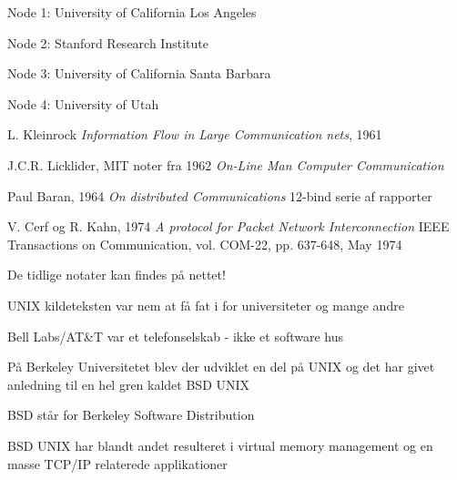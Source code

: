\documentclass[Screen16to9,17pt]{foils}
\begin{document}

\begin{list2}
\item Node 1: University of California Los Angeles
\item Node 2: Stanford Research Institute
\item Node 3: University of California Santa Barbara
\item Node 4: University of Utah
\end{list2}


\begin{list1}
\item L. Kleinrock \emph{Information Flow in Large Communication nets}, 1961
\item J.C.R. Licklider, MIT noter fra 1962 \emph{On-Line Man Computer
  Communication}
\item Paul Baran, 1964 \emph{On distributed Communications}
12-bind serie af rapporter\\
\item V. Cerf og R. Kahn, 1974
\emph{A protocol for Packet Network Interconnection}
IEEE Transactions on Communication, vol. COM-22, pp. 637-648, May 1974
\item De tidlige notater kan findes på nettet!
\end{list1}



\begin{list1}
  \item UNIX kildeteksten var nem at få fat i for universiteter og
  mange andre
\item Bell Labs/AT\&T var et telefonselskab - ikke et software hus
\item På Berkeley Universitetet blev der udviklet en del på UNIX og
  det har givet anledning til en hel gren kaldet BSD UNIX
\item BSD står for Berkeley Software Distribution
\item BSD UNIX har blandt andet resulteret i virtual memory management
  og en masse TCP/IP relaterede applikationer
\end{list1}
\end{document}
